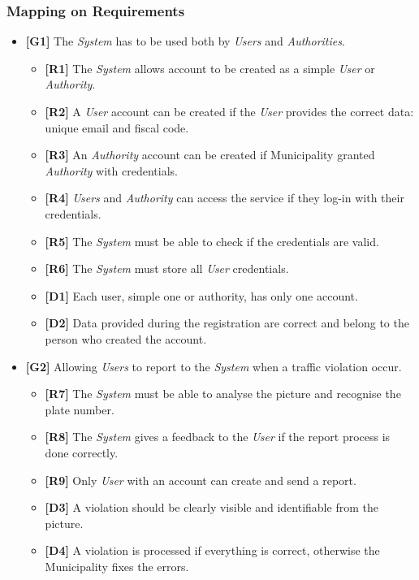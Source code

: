 \documentclass {article}
\begin{document}
	\subsubsection{Mapping on Requirements}
	\begin{itemize}
			 \item {\bf [G1]} The {\it System} has to be used both by {\it Users} and {\it Authorities}.
			 \begin{itemize}
			 \item {\bf [R1]} The {\it System} allows account to be created as a simple {\it User} or {\it Authority}.
			 \item {\bf [R2]} A {\it User} account can be created if the {\it User} provides the correct data: unique email and fiscal code. 
			 \item {\bf [R3]} An {\it Authority} account can be created if Municipality granted {\it Authority} with credentials. 
			 \item {\bf [R4]} {\it Users} and {\it Authority} can access the service if they log-in with their credentials.
			 \item {\bf [R5]} The {\it System} must be able to check if the credentials are valid.
			 \item {\bf [R6]} The {\it System} must store all {\it User} credentials. 
			 \item {\bf [D1]} Each user, simple one or authority, has only one account.
			 \item {\bf [D2]} Data provided during the registration are correct and belong to the person who created the account.
			 \end{itemize}
   			 \item {\bf [G2]} Allowing {\it Users} to report to the {\it System} when a traffic violation occur.		
   			 \begin{itemize}
   			 \item {\bf [R7]} The {\it System} must be able to analyse the picture and recognise the plate number. 
   			 \item {\bf [R8]} The {\it System} gives a feedback to the {\it User} if the report process is done correctly.
   			 \item {\bf [R9]} Only {\it User} with an account can create and send a report.
   			 \item {\bf [D3]} A violation should be clearly visible and identifiable from the picture.
   			 \item {\bf [D4]} A violation is processed if everything is correct, otherwise the Municipality fixes the errors.

\end{itemize}
\end{itemize}
\end{document}
